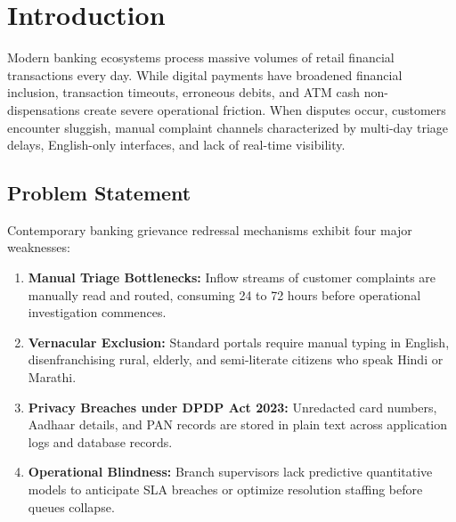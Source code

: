\documentclass[12pt,singleside,a4paper]{article}
\begin{document}
\pagebreak

\tableofcontents
\pagebreak

\section{Introduction}
Modern banking ecosystems process massive volumes of retail financial transactions every day. While digital payments have broadened financial inclusion, transaction timeouts, erroneous debits, and ATM cash non-dispensations create severe operational friction. When disputes occur, customers encounter sluggish, manual complaint channels characterized by multi-day triage delays, English-only interfaces, and lack of real-time visibility.

\subsection{Problem Statement}
Contemporary banking grievance redressal mechanisms exhibit four major weaknesses:
\begin{enumerate}
    \item \textbf{Manual Triage Bottlenecks:} Inflow streams of customer complaints are manually read and routed, consuming 24 to 72 hours before operational investigation commences.
    \item \textbf{Vernacular Exclusion:} Standard portals require manual typing in English, disenfranchising rural, elderly, and semi-literate citizens who speak Hindi or Marathi.
    \item \textbf{Privacy Breaches under DPDP Act 2023:} Unredacted card numbers, Aadhaar details, and PAN records are stored in plain text across application logs and database records.
    \item \textbf{Operational Blindness:} Branch supervisors lack predictive quantitative models to anticipate SLA breaches or optimize resolution staffing before queues collapse.
\end{enumerate}
\end{document}
